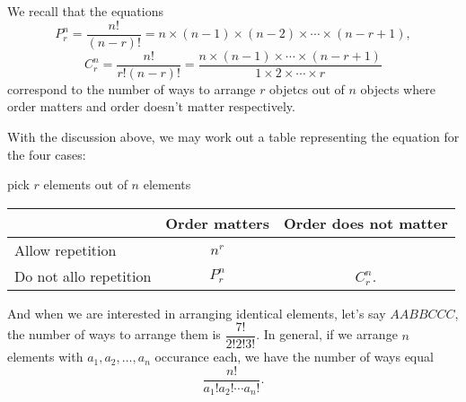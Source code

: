 
\begin{shortque}[Introduction]{}



\end{shortque}

\begin{mysubsection}{}
    We recall that the equations
    \begin{equation*}
        P^n_r=\dfrac{n!}{(n-r)!}=n\times (n-1)\times (n-2)\times \cdots\times (n-r+1),
    \end{equation*}
    \begin{equation*}
        C^n_r=\dfrac{n!}{r!(n-r)!}=\dfrac{n\times (n-1)\times  \cdots\times (n-r+1)}{1\times 2\times \cdots\times r}
    \end{equation*}
    correspond to the number of ways to arrange $r$ objetcs out of $n$ objects where order matters and order doesn't matter respectively.

    \mynewpage

    With the discussion above, we may work out a table representing the equation for the four cases:

    pick $r$ elements out of $n$ elements

    \begin{tabular}{l|c|c}
        &Order matters&Order does not matter\\
        \hline
        Allow repetition& $n^r$& \\
        \hline
        Do not allo repetition & $P^n_r$& $C^n_r$.
    \end{tabular}

    And when we are interested in arranging identical elements, let's say $AABBCCC$, the number of ways to arrange them is $\dfrac{7!}{2!2!3!}$. In general, if we arrange $n$ elements with $a_1,a_2,\dots ,a_n$ occurance each, we have the number of ways equal
    \[\frac{n!}{a_1!a_2!\cdots a_n!}.\]
\end{mysubsection}

